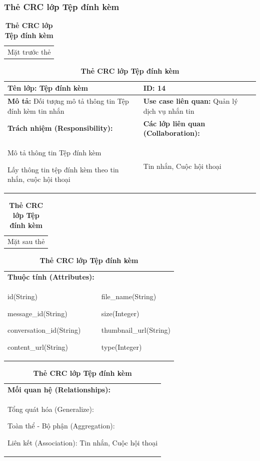   \subsubsection{Thẻ CRC lớp Tệp đính kèm}
  \begin{table}[H]
    \caption{\bfseries \fontsize{12pt}{0pt}\selectfont Thẻ CRC lớp Tệp đính kèm}
    \centering
    \begin{tabularx}{0.9\textwidth}{X}
      Mặt trước thẻ
    \end{tabularx}
    \begin{tabularx}{0.9\textwidth}{|X|X|}
      \hline
      \textbf{Tên lớp:} Tệp đính kèm & \textbf{ID:} 14 \\
      \hline
      \textbf{Mô tả:} Đối tượng mô tả thông tin Tệp đính kèm tin nhắn & \textbf{Use case liên quan:} Quản lý dịch vụ nhắn tin \\
      \hline
      \textbf{Trách nhiệm (Responsibility):} & \textbf{Các lớp liên quan (Collaboration):} \\
      Mô tả thông tin Tệp đính kèm

      Lấy thông tin tệp đính kèm theo tin nhắn, cuộc hội thoại
      & 
      Tin nhắn, Cuộc hội thoại
      \\
      \hline
    \end{tabularx}
    \begin{tabularx}{0.9\textwidth}{X}
      Mặt sau thẻ
    \end{tabularx}
    \begin{tabularx}{0.9\textwidth}{|X|X|}
      \hline
      \textbf{Thuộc tính (Attributes):} & \\
      id(String) 
      
      message\_id(String)

      conversation\_id(String)

      content\_url(String)
      &
      file\_name(String)

      size(Integer)

      thumbnail\_url(String)

      type(Integer)
      \\
      \hline
    \end{tabularx}
    \begin{tabularx}{0.9\textwidth}{|X|}
      \textbf{Mối quan hệ (Relationships):} \\
      Tổng quát hóa (Generalize):  

      Toàn thể - Bộ phận (Aggregation): 
      
      Liên kết (Association): Tin nhắn, Cuộc hội thoại 
      \\
      \hline
    \end{tabularx}
  \end{table}

